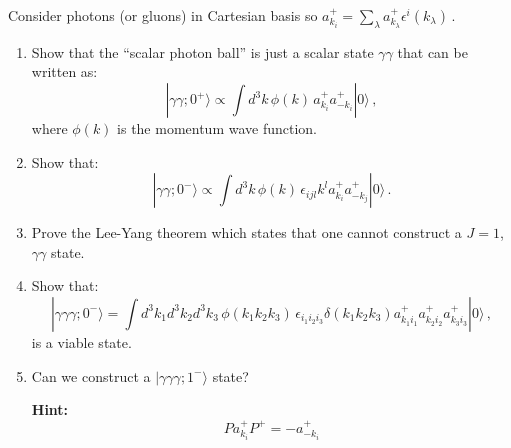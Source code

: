 Consider photons (or gluons) in Cartesian basis so $a^+_{k_{i}} = \sum_\lambda a^+_{k_{\lambda}} \epsilon^i (k_{\lambda})$\,.
\begin{enumerate}
      \item Show that the ``scalar photon ball'' is just a scalar state $\gamma\gamma$ that can be written as:
            $$| \gamma\gamma; 0^+ \rangle \propto \int d^3 k \, \phi(k) \, a^+_{k_{i}}a^+_{-k_{i}}| 0 \rangle\,,$$ where $\phi(k)$ is the momentum wave function.
      \item Show that: $$| \gamma\gamma; 0^- \rangle \propto \int d^3 k \, \phi(k) \,\epsilon_{ijl} k^l a^+_{k_{i}}a^+_{-k_{j}}| 0 \rangle\,.$$
      \item Prove the Lee-Yang theorem which states that one cannot construct a $J = 1$, $\gamma\gamma$  state.
      \item  Show that:
            $$| \gamma\gamma\gamma; 0^- \rangle= \int d^3 k_1 d^3 k_2 d^3 k_3 \, \phi(k_1k_2k_3) \, \epsilon_{i_1i_2i_3}\delta(k_1k_2k_3) a^+_{k_{1}i_1}a^+_{k_{2}i_2}a^+_{k_{3}i_3}| 0 \rangle\,,$$ is a viable state.
      \item  Can we construct a $| \gamma\gamma\gamma; 1^- \rangle$ state?

            \textbf{Hint:}
            $$Pa^+_{k_i}P^+=-a^+_{-k_i}$$
\end{enumerate}
